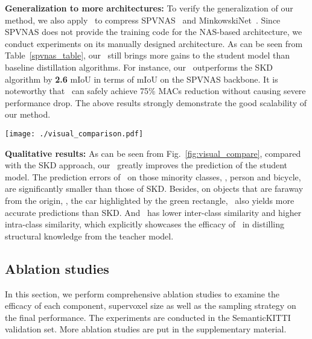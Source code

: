\noindent \textbf{Generalization to more architectures:} To verify the generalization of our method, we also apply \algorithmname~to compress SPVNAS~\cite{tang2020searching} and MinkowskiNet~\cite{choy20194d}. Since SPVNAS does not provide the training code for the NAS-based architecture, we conduct experiments on its manually designed architecture. As can be seen from Table~\ref{spvnas_table}, our \algorithmname~still brings more gains to the student model than baseline distillation algorithms. For instance, our \algorithmname~outperforms the SKD algorithm by \textbf{2.6} mIoU in terms of mIoU on the SPVNAS backbone. It is noteworthy that \algorithmname~can safely achieve 75\% MACs reduction without causing severe performance drop. The above results strongly demonstrate the good scalability of our method.


\begin{figure*}[t]
 \centering
 \texttt{[image: ./visual\_comparison.pdf]}
 \vskip -0.3cm
 \caption{Visual comparison of different methods on the SemanticKITTI validation set. Here, the ground-truth for the inter-voxel affinity map is the ideal map where the intra-class similarity score is 1 and inter-class similarity score is 0.}
 \centering
 \vskip -0.6cm
 \label{fig:visual_compare}
\end{figure*}

\noindent \textbf{Qualitative results:} As can be seen from Fig.~\ref{fig:visual_compare}, compared with the SKD approach, our \algorithmname~greatly improves the prediction of the student model. The prediction errors of \algorithmname~on those minority classes, \eg, person and bicycle, are significantly smaller than those of SKD. Besides, on objects that are faraway from the origin, \eg, the car highlighted by the green rectangle, \algorithmname~also yields more accurate predictions than SKD. And \algorithmname~has lower inter-class similarity and higher intra-class similarity, which explicitly showcases the efficacy of \algorithmname~in distilling structural knowledge from the teacher model.     

\noindent 


\subsection{Ablation studies}

In this section, we perform comprehensive ablation studies to examine the efficacy of each component, supervoxel size as well as the sampling strategy on the final performance. The experiments are conducted in the SemanticKITTI validation set. More ablation studies are put in the supplementary material.

